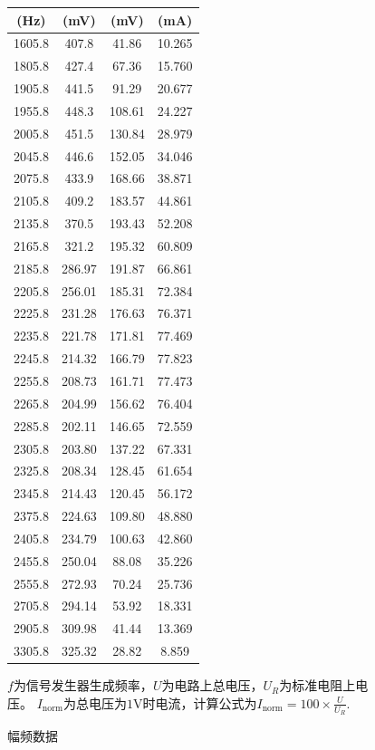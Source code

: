 \documentclass{ctexart}
\begin{document}
\begin{figure}[p]
\begin{minipage}[t]{0.45\textwidth}
\begin{tabular}{||c|c|c|c||}
                (Hz) & (mV) & (mV) & (mA) \\
                \hline
                1605.8 & 407.8 & 41.86  & 10.265  \\
                1805.8 & 427.4 & 67.36  & 15.760  \\
                1905.8 & 441.5 & 91.29  & 20.677  \\
                1955.8 & 448.3 & 108.61  & 24.227  \\
                2005.8 & 451.5 & 130.84  & 28.979  \\
                2045.8 & 446.6 & 152.05  & 34.046  \\
                2075.8 & 433.9 & 168.66  & 38.871  \\
                2105.8 & 409.2 & 183.57  & 44.861  \\
                2135.8 & 370.5 & 193.43  & 52.208  \\
                2165.8 & 321.2 & 195.32  & 60.809  \\
                2185.8 & 286.97  & 191.87  & 66.861  \\
                2205.8 & 256.01  & 185.31  & 72.384  \\
                2225.8 & 231.28  & 176.63  & 76.371  \\
                2235.8 & 221.78  & 171.81  & 77.469  \\
                2245.8 & 214.32  & 166.79  & 77.823  \\
                2255.8 & 208.73  & 161.71  & 77.473  \\
                2265.8 & 204.99  & 156.62  & 76.404  \\
                2285.8 & 202.11  & 146.65  & 72.559  \\
                2305.8 & 203.80  & 137.22  & 67.331  \\
                2325.8 & 208.34  & 128.45  & 61.654  \\
                2345.8 & 214.43  & 120.45  & 56.172  \\
                2375.8 & 224.63  & 109.80  & 48.880  \\
                2405.8 & 234.79  & 100.63  & 42.860  \\
                2455.8 & 250.04  & 88.08  & 35.226  \\
                2555.8 & 272.93  & 70.24  & 25.736  \\
                2705.8 & 294.14  & 53.92  & 18.331  \\
                2905.8 & 309.98  & 41.44  & 13.369  \\
                3305.8 & 325.32  & 28.82  & 8.859  \\
                \hline
            \end{tabular}%
            \captionsetup{type=table}
            \caption{幅频数据}
            \quad $f$为信号发生器生成频率，$U$为电路上总电压，$U_R$为标准电阻上电压。
            $I_\textrm{norm}$为总电压为$1$V时电流，计算公式为$I_\textrm{norm} = 100\times\frac{U}{U_R}$.
       
        \end{minipage}
    \end{figure}%
\end{document}
